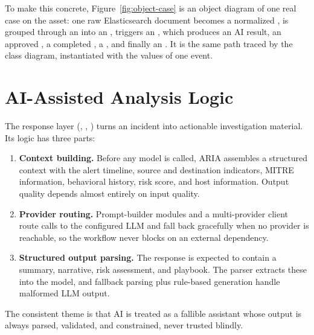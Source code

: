 To make this concrete, Figure~\ref{fig:object-case} is an object diagram of one real case on the  asset: one raw Elasticsearch document becomes a normalized , is grouped through an  into an , triggers an , which produces an AI result, an approved , a completed , a , and finally an . It is the same path traced by the class diagram, instantiated with the values of one event.


\section{AI-Assisted Analysis Logic}

The response layer (, , ) turns an incident into actionable investigation material. Its logic has three parts:

\begin{enumerate}[leftmargin=1cm]
\item \textbf{Context building.} Before any model is called, ARIA assembles a structured context with the alert timeline, source and destination indicators, MITRE information, behavioral history, risk score, and host information. Output quality depends almost entirely on input quality.
\item \textbf{Provider routing.} Prompt-builder modules and a multi-provider client route calls to the configured LLM and fall back gracefully when no provider is reachable, so the workflow never blocks on an external dependency.
\item \textbf{Structured output parsing.} The response is expected to contain a summary, narrative, risk assessment, and playbook. The parser extracts these into the  model, and fallback parsing plus rule-based generation handle malformed LLM output.
\end{enumerate}

The consistent theme is that AI is treated as a fallible assistant whose output is always parsed, validated, and constrained, never trusted blindly.


